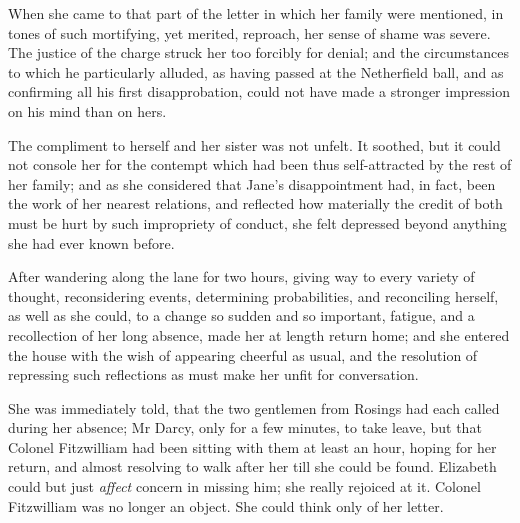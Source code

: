 When she came to that part of the letter in which her family were mentioned, in tones of such mortifying, yet merited, reproach, her sense of shame was severe. The justice of the charge struck her too forcibly for denial; and the circumstances to which he particularly alluded, as having passed at the Netherfield ball, and as confirming all his first disapprobation, could not have made a stronger impression on his mind than on hers.

The compliment to herself and her sister was not unfelt. It soothed, but it could not console her for the contempt which had been thus self-attracted by the rest of her family; and as she considered that Jane's disappointment had, in fact, been the work of her nearest relations, and reflected how materially the credit of both must be hurt by such impropriety of conduct, she felt depressed beyond anything she had ever known before.

After wandering along the lane for two hours, giving way to every variety of thought, reconsidering events, determining probabilities, and reconciling herself, as well as she could, to a change so sudden and so important, fatigue, and a recollection of her long absence, made her at length return home; and she entered the house with the wish of appearing cheerful as usual, and the resolution of repressing such reflections as must make her unfit for conversation.

She was immediately told, that the two gentlemen from Rosings had each called during her absence; Mr Darcy, only for a few minutes, to take leave, but that Colonel Fitzwilliam had been sitting with them at least an hour, hoping for her return, and almost resolving to walk after her till she could be found. Elizabeth could but just \textit{affect} concern in missing him; she really rejoiced at it. Colonel Fitzwilliam was no longer an object. She could think only of her letter.